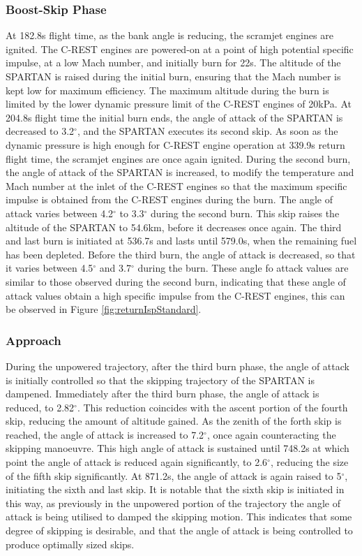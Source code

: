 \subsubsection{ Boost-Skip Phase}
At 182.8s flight time, as the bank angle is reducing, the scramjet engines are ignited. The C-REST engines are powered-on at a point of high potential specific impulse, at a low Mach number, and initially burn for 22s. The altitude of the SPARTAN is raised during the initial burn, ensuring that the Mach number is kept low for maximum efficiency. The maximum altitude during the burn is limited by the lower dynamic pressure limit of the C-REST engines of 20kPa. 
At 204.8s flight time the initial burn ends, the angle of attack of the SPARTAN is decreased to 3.2$^\circ$, and the SPARTAN executes its second skip. As soon as the dynamic pressure is high enough for C-REST engine operation at 339.9s return flight time, the scramjet engines are once again ignited.
During the second burn, the angle of attack of the SPARTAN is increased, to modify the temperature and Mach number at the inlet of the C-REST engines so that the maximum specific impulse is obtained from the C-REST engines during the burn. 
The angle of attack varies between 4.2$^\circ$ to 3.3$^\circ$ during the second burn. 
This skip raises the altitude of the SPARTAN to 54.6km, before it decreases once again. 
The third and last burn is initiated at 536.7s and lasts until 579.0s, when the remaining fuel has been depleted. Before the third burn, the angle of attack is decreased, so that it varies between 4.5$^\circ$ and 3.7$^\circ$ during the burn. These angle fo attack values are similar to those observed during the second burn, indicating that these angle of attack values obtain a high specific impulse from the C-REST engines, this can be observed in Figure \ref{fig:returnIspStandard}. 


\subsubsection{ Approach}

During the unpowered trajectory, after the third burn phase, the angle of attack is initially controlled so that the skipping trajectory of the SPARTAN is dampened.
Immediately after the third burn phase, the angle of attack is reduced, to 2.82$^\circ$. This reduction coincides with the ascent portion of the fourth skip, reducing the amount of altitude gained. 
As the zenith of the forth skip is reached, the angle of attack is increased to 7.2$^\circ$, once again counteracting the skipping manoeuvre. 
This high angle of attack is sustained until 748.2s at which point the angle of attack is reduced again significantly, to 2.6$^\circ$, reducing the size of the fifth skip significantly. At 871.2s, the angle of attack is again raised to 5$^\circ$, initiating the sixth and last skip.
It is notable that the sixth skip is initiated in this way, as previously in the unpowered portion of the trajectory the angle of attack is being utilised to damped the skipping motion. This indicates that some degree of skipping is desirable, and that the angle of attack is being controlled to produce optimally sized skips. 

